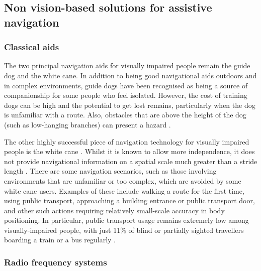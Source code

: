 \subsection{Non vision-based solutions for assistive navigation}

\subsubsection{Classical aids}

The two principal navigation aids for visually impaired people remain the guide dog and the white cane.  In addition to being good navigational aids outdoors and in complex environments, guide dogs have been recognised as being a source of companionship for some people who feel isolated. However, the cost of training dogs can be high and the potential to get lost remains, particularly when the dog is unfamiliar with a route. Also, obstacles that are above the height of the dog (such as low-hanging branches) can present a hazard \citep{manduchi2011mobility}. 

The other highly successful piece of navigation technology for visually impaired people is the white cane \citep{roentgen2008inventory}.  Whilst it is known to allow more independence, it does not provide  navigational information on a spatial scale much greater than a stride length \citep{maidenbaum2013increasing}. There are some navigation scenarios, such as those involving environments that are unfamiliar or too complex, which are avoided by some white cane users. Examples of these include walking a route for the first time, using public transport, approaching a building entrance or public transport door, and other such actions requiring relatively small-scale accuracy in body positioning. In particular, public transport usage remains extremely low among visually-impaired people, with just 11\% of blind or partially sighted travellers boarding a train or a bus regularly \citep{Pey2006}.

\subsubsection{Radio frequency systems}


